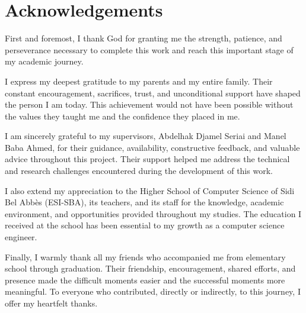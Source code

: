 \chapter*{Acknowledgements}

First and foremost, I thank God for granting me the strength, patience, and
perseverance necessary to complete this work and reach this important stage of
my academic journey.

I express my deepest gratitude to my parents and my entire family. Their
constant encouragement, sacrifices, trust, and unconditional support have
shaped the person I am today. This achievement would not have been possible
without the values they taught me and the confidence they placed in me.

I am sincerely grateful to my supervisors, Abdelhak Djamel Seriai and Manel Baba
Ahmed, for their guidance, availability, constructive feedback, and valuable
advice throughout this project. Their support helped me address the technical
and research challenges encountered during the development of this work.

I also extend my appreciation to the Higher School of Computer Science of Sidi
Bel Abbès (ESI-SBA), its teachers, and its staff for the knowledge, academic
environment, and opportunities provided throughout my studies. The education
I received at the school has been essential to my growth as a computer science
engineer.

Finally, I warmly thank all my friends who accompanied me from elementary
school through graduation. Their friendship, encouragement, shared efforts,
and presence made the difficult moments easier and the successful moments more
meaningful. To everyone who contributed, directly or indirectly, to this
journey, I offer my heartfelt thanks.
